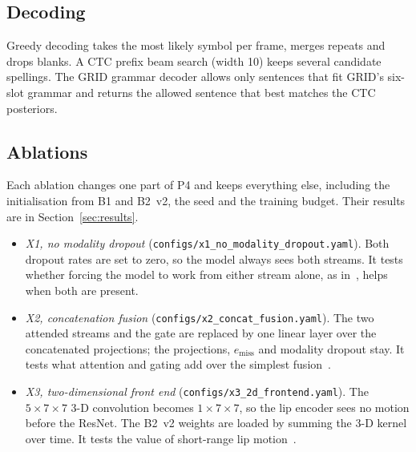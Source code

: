 \subsection{Decoding}
Greedy decoding takes the most likely symbol per frame, merges repeats and drops blanks. A CTC
prefix beam search (width 10) keeps several candidate spellings. The GRID grammar decoder
allows only sentences that fit GRID's six-slot grammar and returns the allowed sentence that
best matches the CTC posteriors.

\subsection{Ablations}
\label{sec:ablations}
Each ablation changes one part of P4 and keeps everything else, including the initialisation from
B1 and B2~v2, the seed and the training budget. Their results are in Section~\ref{sec:results}.
\begin{itemize}
\item \textit{X1, no modality dropout} (\texttt{configs/\allowbreak{}x1\_\allowbreak{}no\_\allowbreak{}modality\_\allowbreak{}dropout.yaml}). Both
dropout rates are set to zero, so the model always sees both streams. It tests whether forcing the
model to work from either stream alone, as in~\cite{zhang2019}, helps when both are present.
\item \textit{X2, concatenation fusion} (\texttt{configs/\allowbreak{}x2\_\allowbreak{}concat\_\allowbreak{}fusion.yaml}). The two attended
streams and the gate are replaced by one linear layer over the concatenated projections; the
projections, $e_{\text{miss}}$ and modality dropout stay. It tests what attention and gating add
over the simplest fusion~\cite{abdelaziz2018}.
\item \textit{X3, two-dimensional front end} (\texttt{configs/\allowbreak{}x3\_\allowbreak{}2d\_\allowbreak{}frontend.yaml}). The $5 \times 7 \times 7$
3-D convolution becomes $1 \times 7 \times 7$, so the lip encoder sees no motion before the ResNet.
The B2~v2 weights are loaded by summing the 3-D kernel over time. It tests the value of short-range
lip motion~\cite{stafylakis2017}.
\end{itemize}
